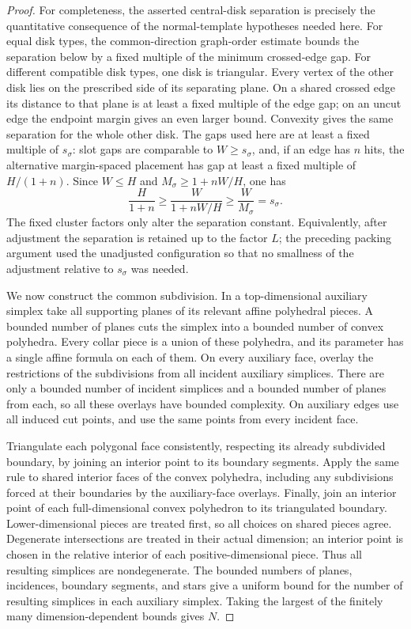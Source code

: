 \documentclass[11pt]{article}
\numberwithin{equation}{section}
\theoremstyle{definition}
\theoremstyle{remark}
\begin{document}
\begin{proof}
For completeness, the asserted central-disk separation is precisely
the quantitative consequence of the normal-template hypotheses
needed here.  For equal disk types, the common-direction graph-order
estimate bounds the separation below by a fixed multiple of the
minimum crossed-edge gap.  For different compatible disk types, one
disk is triangular.  Every vertex of the other disk lies on the
prescribed side of its separating plane.  On a shared crossed edge
its distance to that plane is at least a fixed multiple of the edge
gap; on an uncut edge the endpoint margin gives an even larger
bound.  Convexity gives the same separation for the whole other
disk.  The gaps used here are at least a fixed multiple of
$s_\sigma$: slot gaps are comparable to $W\geq s_\sigma$, and, if an
edge has $n$ hits, the alternative margin-spaced placement has gap
at least a fixed multiple of $H/(1+n)$.  Since $W\leq H$ and
$M_\sigma\geq 1+nW/H$, one has
\[
 \frac{H}{1+n}\geq\frac{W}{1+nW/H}
 \geq\frac{W}{M_\sigma}=s_\sigma.
\]
The fixed cluster factors only alter the separation constant.
Equivalently, after adjustment the separation is retained up to the
factor $L$; the preceding packing argument used the unadjusted
configuration so that no smallness of the adjustment relative to
$s_\sigma$ was needed.

We now construct the common subdivision.  In a top-dimensional
auxiliary simplex take all supporting planes of its relevant affine
polyhedral pieces.  A bounded number of planes cuts the simplex into
a bounded number of convex polyhedra.  Every collar piece is a union
of these polyhedra, and its parameter has a single affine formula on
each of them.  On every auxiliary face, overlay the restrictions of
the subdivisions from all incident auxiliary simplices.  There are
only a bounded number of incident simplices and a bounded number of
planes from each, so all these overlays have bounded complexity.
On auxiliary edges use all induced cut points, and use the same
points from every incident face.

Triangulate each polygonal face consistently, respecting its already
subdivided boundary, by joining an interior point to its boundary
segments.  Apply the same rule to shared interior faces of the
convex polyhedra, including any subdivisions forced at their
boundaries by the auxiliary-face overlays.  Finally, join an
interior point of each full-dimensional convex polyhedron to its
triangulated boundary.  Lower-dimensional pieces are treated first,
so all choices on shared pieces agree.  Degenerate intersections
are treated in their actual dimension; an interior point is chosen
in the relative interior of each positive-dimensional piece.
Thus all resulting simplices are nondegenerate.  The bounded
numbers of planes, incidences, boundary segments, and stars give a
uniform bound for the number of resulting simplices in each
auxiliary simplex.  Taking the largest of the finitely many
dimension-dependent bounds gives $N$.
\end{proof}
\end{document}
